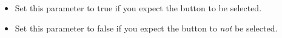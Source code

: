 \begin{itemize}
\item Set this parameter to true{} if you expect the button to be  selected.
\item Set this parameter to false{} if you expect the button to \emph{not} be selected.
\end{itemize}


